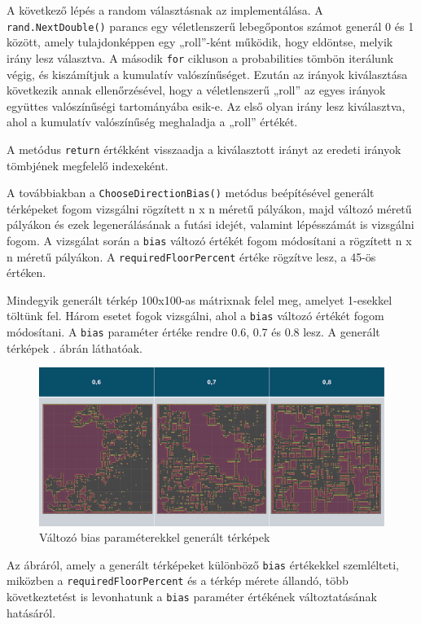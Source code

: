 A következő lépés a random választásnak az implementálása. A \texttt{rand.NextDouble()} parancs egy véletlenszerű lebegőpontos számot generál 0 és 1 között, amely tulajdonképpen egy „roll”-ként működik, hogy eldöntse, melyik irány lesz választva. A második \texttt{for} cikluson a probabilities tömbön iterálunk végig, és kiszámítjuk a kumulatív valószínűséget. Ezután az irányok kiválasztása következik annak ellenőrzésével, hogy a véletlenszerű „roll” az egyes irányok együttes valószínűségi tartományába esik-e. Az első olyan irány lesz kiválasztva, ahol a kumulatív valószínűség meghaladja a „roll” értékét.

A metódus \texttt{return} értékként visszaadja a kiválasztott irányt az eredeti irányok tömbjének megfelelő indexeként.

A továbbiakban a \texttt{ChooseDirectionBias()} metódus beépítésével generált térképeket fogom vizsgálni rögzített n x n méretű pályákon, majd változó méretű pályákon és ezek legenerálásának a futási idejét, valamint lépésszámát is vizsgálni fogom. A vizsgálat során a \texttt{bias} változó értékét fogom módosítani a rögzített n x n méretű pályákon. A \texttt{requiredFloorPercent} értéke rögzítve lesz, a 45-ös értéken.

Mindegyik generált térkép 100x100-as mátrixnak felel meg, amelyet 1-esekkel töltünk fel. Három esetet fogok vizsgálni, ahol a \texttt{bias} változó értékét fogom módosítani. A \texttt{bias} paraméter értéke rendre 0.6, 0.7 és 0.8 lesz. A generált térképek . ábrán láthatóak.

\begin{figure}[ht]
\centering
\includegraphics[width = \textwidth]{images/fixedpercentrandomwalk.png}
\caption{Változó bias paraméterekkel generált térképek}
\label{fig:fixedPercentRandomWalk}
\end{figure}

\newpage
Az ábráról, amely a generált térképeket különböző \texttt{bias} értékekkel szemlélteti, miközben a \texttt{requiredFloorPercent} és a térkép mérete állandó, több következtetést is levonhatunk a \texttt{bias} paraméter értékének változtatásának hatásáról.

